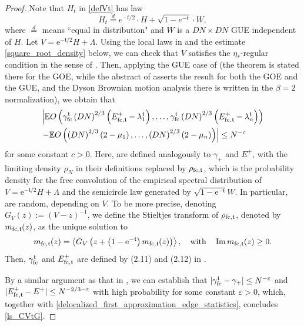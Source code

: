 \documentclass[10pt,reqno]{amsart}
\numberwithin{equation}{section}
\numberwithin{figure}{section}
\theoremstyle{plain} %
\theoremstyle{definition} %
\renewcommand{\r}{\mathrm} \newcommand{\rr}{\mathrm} %
\renewcommand{\txt}[1]{\text{\rm{#1}}}
\newcommand{\E}{\mathbb{E}}
\newcommand{\ft}{{\mathfrak t}}
\renewcommand{\leq}{\le}
\newcommand{\pa}[1]{\left({#1}\right)}
\newcommand{\abs}[1]{\lvert #1 \rvert}
\newcommand{\avga}[1]{\left\langle #1 \right\rangle}
\DeclareMathOperator{\im}{\mathrm{Im}}
\newcommand{\be}{\begin{equation}}
\newcommand{\ee}{\end{equation}}
\numberwithin{equation}{section}
\begin{document}
\begin{proof} 
Note that $H_t$ in \eqref{defVt} has law 
\be\label{eq:eq_in_law_H}
H_t \stackrel{d}{=} e^{-t/2}\cdot H+ \sqrt{1-e^{-t}}\cdot W,
\ee
where $\stackrel{d}{=}$ means ``equal in distribution" and $W$ is a $DN\times DN$ GUE independent of $H$. Let $V=\r e^{-\ft/2}H+\Lambda$.  Using the local laws in  and the estimate \eqref{square_root_density} below, we can check that $V$ satisfies the $\eta_*$-regular condition in the sense of \cite[Definition 2.1]{landon2017edgestatisticsdysonbrownian}. %
Then, applying the GUE case of \cite[Theorem 2.2]{landon2017edgestatisticsdysonbrownian} (the theorem is stated there for the GOE, while the abstract of \cite{landon2017edgestatisticsdysonbrownian} asserts the result for both the GOE and the GUE, and the Dyson Brownian motion analysis there is written in the $\beta=2$ normalization), we obtain that
\begin{equation}\label{delocalized_first_approximation_edge_statistics}
    \begin{aligned}
        &\left|	\E O\pa{\gamma_{\txt{fc}}^\ft \pa{DN}^{2/3}\pa{E_{\txt{fc},\ft}^+-\lambda_1^{\ft}},\ldots, \gamma_{\txt{fc}}^{\ft} \pa{DN}^{2/3}\pa{E_{\txt{fc},\ft}^+-\lambda_n^{\ft}}}\right.\\
        &\left.-\E O\pa{ \pa{DN}^{2/3}\pa{2-\mu_1},\ldots, \pa{DN}^{2/3}\pa{2-\mu_n}}   \right|\leq N^{-c}
    \end{aligned}
\end{equation}
for some constant $c>0$. Here, \smash{$\gamma_{\txt{fc}}^\ft$ and $E_{\txt{fc},\ft}^+$} are defined analogously to $\gamma_+$ and $E^+$, with the limiting density $\rho_N$ in their definitions replaced by $\rho_{\txt{fc},\ft}$, which is the probability density for the free convolution of the empirical spectral distribution of $V=\r e^{-\ft/2}H+\Lambda$ and the semicircle law generated by $\sqrt{1-\r e^{-\ft}}W$. In particular, \smash{$\gamma_{\txt{fc}}^\ft$ and $E_{\txt{fc},\ft}^+$} are random, depending on $V$. To be more precise, denoting $G_V (z) :=\pa{V-z}^{-1}$, we define the Stieltjes transform of $\rho_{\txt{fc},\ft}$, denoted by $m_{\txt{fc},\ft} (z) $, as the unique solution to 
\begin{equation}\nonumber
    \begin{aligned}
        m_{\txt{fc},\ft} (z) =\avga{G_V\pa{z+\pa{1-\r e^{-\ft}}m_{\txt{fc},\ft} (z) }},\quad \text{with}\quad \im m_{\txt{fc},\ft} (z) \ge 0.
    \end{aligned}
\end{equation}
Then, $\gamma_{\txt{fc}}^\ft$ and $E_{\txt{fc},\ft}^+$ are defined by (2.11) and (2.12) in \cite[Lemma 2.3]{landon2017edgestatisticsdysonbrownian}. 

By a similar argument as that in \cite[Section 6.1]{CorrelatedBandAOP}, we can establish that $\abs{\gamma_{\txt{fc}}^\ft-\gamma_+}\leq N^{-\varepsilon}$ and $\abs{E_{\txt{fc},\ft}^+-E^+}\leq N^{-2/3-\varepsilon}$ with high probability for some constant $\varepsilon>0$, which, together with \eqref{delocalized_first_approximation_edge_statistics}, concludes \eqref{ls_CVtG}.
\end{proof}
\end{document}
